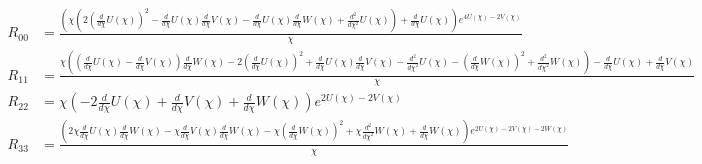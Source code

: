 \begin{align*}
R_{00} &= \frac{\left(\chi \left(2 \left(\frac{d}{d \chi} U{\left(\chi \right)}\right)^{2} - \frac{d}{d \chi} U{\left(\chi \right)} \frac{d}{d \chi} V{\left(\chi \right)} - \frac{d}{d \chi} U{\left(\chi \right)} \frac{d}{d \chi} W{\left(\chi \right)} + \frac{d^{2}}{d \chi^{2}} U{\left(\chi \right)}\right) + \frac{d}{d \chi} U{\left(\chi \right)}\right) e^{4 U{\left(\chi \right)} - 2 V{\left(\chi \right)}}}{\chi} \\
R_{11} &= \frac{\chi \left(\left(\frac{d}{d \chi} U{\left(\chi \right)} - \frac{d}{d \chi} V{\left(\chi \right)}\right) \frac{d}{d \chi} W{\left(\chi \right)} - 2 \left(\frac{d}{d \chi} U{\left(\chi \right)}\right)^{2} + \frac{d}{d \chi} U{\left(\chi \right)} \frac{d}{d \chi} V{\left(\chi \right)} - \frac{d^{2}}{d \chi^{2}} U{\left(\chi \right)} - \left(\frac{d}{d \chi} W{\left(\chi \right)}\right)^{2} + \frac{d^{2}}{d \chi^{2}} W{\left(\chi \right)}\right) - \frac{d}{d \chi} U{\left(\chi \right)} + \frac{d}{d \chi} V{\left(\chi \right)}}{\chi} \\
R_{22} &= \chi \left(- 2 \frac{d}{d \chi} U{\left(\chi \right)} + \frac{d}{d \chi} V{\left(\chi \right)} + \frac{d}{d \chi} W{\left(\chi \right)}\right) e^{2 U{\left(\chi \right)} - 2 V{\left(\chi \right)}} \\
R_{33} &= \frac{\left(2 \chi \frac{d}{d \chi} U{\left(\chi \right)} \frac{d}{d \chi} W{\left(\chi \right)} - \chi \frac{d}{d \chi} V{\left(\chi \right)} \frac{d}{d \chi} W{\left(\chi \right)} - \chi \left(\frac{d}{d \chi} W{\left(\chi \right)}\right)^{2} + \chi \frac{d^{2}}{d \chi^{2}} W{\left(\chi \right)} + \frac{d}{d \chi} W{\left(\chi \right)}\right) e^{2 U{\left(\chi \right)} - 2 V{\left(\chi \right)} - 2 W{\left(\chi \right)}}}{\chi} \\
\end{align*}
